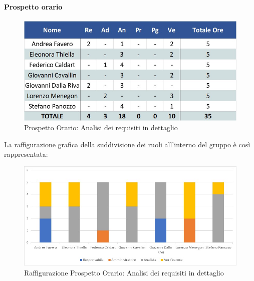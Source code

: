 \paragraph{Prospetto orario}
\begin{figure}[h!]
	\centerline{\includegraphics[scale=0.4]{img/Preventivo/AnalisiRequisitiDettaglioOrario.jpg}}
	\caption{Prospetto Orario: Analisi dei requisiti in dettaglio}
\end{figure}
La raffigurazione grafica della suddivisione dei ruoli all'interno del gruppo è così rappresentata: 
\begin{figure}[h!]
	\centerline{\includegraphics[scale=0.4]{img/Preventivo/Istogrammi/AnalisiRequisitiDettaglio.jpg}}
	\caption{Raffigurazione Prospetto Orario: Analisi dei requisiti in dettaglio}
\end{figure}
